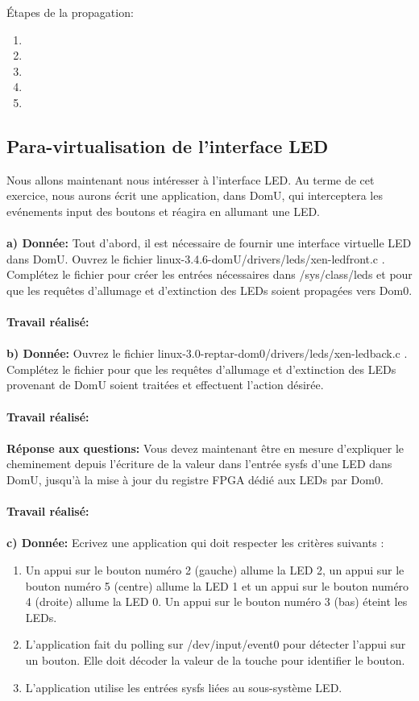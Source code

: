 Étapes de la propagation:
\begin{enumerate}
	\item
	\item
	\item
	\item
	\item
\end{enumerate}
\subsection{Para-virtualisation de l'interface LED}
Nous allons maintenant nous intéresser à l’interface LED. Au terme de cet exercice, nous aurons écrit
une application, dans DomU, qui interceptera les evénements input des boutons et réagira en allumant
une LED.\\\\
\textbf{a) Donnée: }Tout d’abord, il est nécessaire de fournir une interface virtuelle LED dans DomU. Ouvrez le
fichier linux-3.4.6-domU/drivers/leds/xen-ledfront.c . Complétez le fichier pour créer les entrées
nécessaires dans /sys/class/leds et pour que les requêtes d’allumage et d’extinction des LEDs
soient propagées vers Dom0.\\\\
\textbf{Travail réalisé: }\\\\
\textbf{b) Donnée: }Ouvrez le fichier linux-3.0-reptar-dom0/drivers/leds/xen-ledback.c . Complétez le fichier pour que
les requêtes d’allumage et d’extinction des LEDs provenant de DomU soient traitées et effectuent
l’action désirée.\\\\
\textbf{Travail réalisé: }\\\\
\textbf{Réponse aux questions: }Vous devez maintenant être en mesure d'expliquer le cheminement depuis l’écriture de la valeur
dans l’entrée sysfs d’une LED dans DomU, jusqu’à la mise à jour du registre FPGA dédié aux LEDs
par Dom0.\\\\
\textbf{Travail réalisé: }\\\\
\textbf{c) Donnée: }Ecrivez une application qui doit respecter les critères suivants :
\begin{enumerate}
	\item Un appui sur le bouton numéro 2 (gauche) allume la LED 2, un appui sur le bouton numéro 5 (centre)
	allume la LED 1 et un appui sur le bouton numéro 4 (droite) allume la LED 0. Un appui sur le
	bouton numéro 3 (bas) éteint les LEDs.
	\item L’application fait du polling sur /dev/input/event0 pour détecter l’appui sur un bouton. Elle
	doit décoder la valeur de la touche pour identifier le bouton.
	\item L’application utilise les entrées sysfs liées au sous-système LED.
\end{enumerate}

